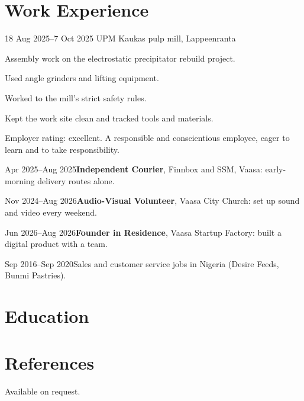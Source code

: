 \documentclass[a4paper,11pt]{article}
\begin{document}
\section{Work Experience}
\begin{cventry}{18 Aug 2025--7 Oct 2025}{}
  UPM Kaukas pulp mill, Lappeenranta\par
  Assembly work on the electrostatic precipitator rebuild project.\par
  Used angle grinders and lifting equipment.\par
  Worked to the mill's strict safety rules.\par
  Kept the work site clean and tracked tools and materials.\par
  Employer rating: excellent. A responsible and conscientious employee, eager to learn and to take responsibility.
\end{cventry}
\begin{cventry}{Apr 2025--Aug 2025}{\textbf{Independent Courier}, Finnbox and SSM, Vaasa: early-morning delivery routes alone.}
\end{cventry}
\begin{cventry}{Nov 2024--Aug 2026}{\textbf{Audio-Visual Volunteer}, Vaasa City Church: set up sound and video every weekend.}
\end{cventry}
\begin{cventry}{Jun 2026--Aug 2026}{\textbf{Founder in Residence}, Vaasa Startup Factory: built a digital product with a team.}
\end{cventry}
\begin{cventry}{Sep 2016--Sep 2020}{Sales and customer service jobs in Nigeria (Desire Feeds, Bunmi Pastries).}
\end{cventry}

\section{Education}

\section{References}
Available on request.
\end{document}
